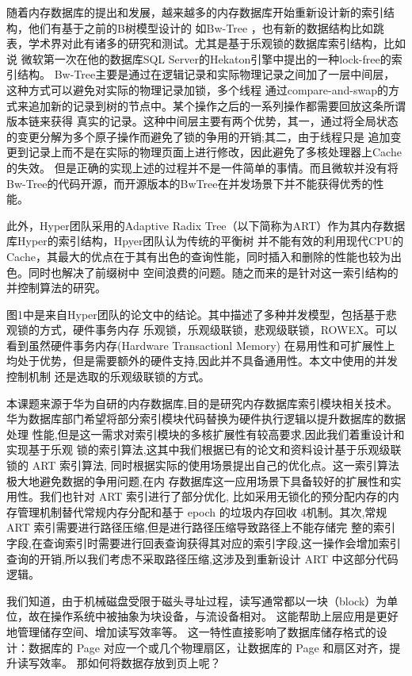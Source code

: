 随着内存数据库的提出和发展，越来越多的内存数据库开始重新设计新的索引结构，他们有基于之前的B树模型设计的
如Bw-Tree\cite{alvarez2015comparison}
\cite{leis2016art}，也有新的数据结构比如跳表，学术界对此有诸多的研究和测试。尤其是基于乐观锁的数据库索引结构，比如说
微软第一次在他的数据库SQL Server的Hekaton引擎中提出的一种lock-free的索引结构。
Bw-Tree主要是通过在逻辑记录和实际物理记录之间加了一层中间层，这种方式可以避免对实际的物理记录加锁，多个线程
通过compare-and-swap的方式来追加新的记录到树的节点中。某个操作之后的一系列操作都需要回放这条所谓版本链来获得
真实的记录。这种中间层主要有两个优势，其一，通过将全局状态的变更分解为多个原子操作而避免了锁的争用的开销;其二，由于线程只是
追加变更到记录上而不是在实际的物理页面上进行修改，因此避免了多核处理器上Cache的失效。
但是正确的实现上述的过程并不是一件简单的事情。而且微软并没有将Bw-Tree的代码开源，而开源版本的BwTree在并发场景下并不能获得优秀的性能。

此外，Hyper团队采用的Adaptive Radix Tree（以下简称为ART）作为其内存数据库Hyper的索引结构，Hpyer团队认为传统的平衡树
并不能有效的利用现代CPU的Cache，其最大的优点在于其有出色的查询性能，同时插入和删除的性能也较为出色。同时也解决了前缀树中
空间浪费的问题。随之而来的是针对这一索引结构的并控制算法的研究。

图1中是来自Hyper团队的论文中的结论。其中描述了多种并发模型，包括基于悲观锁的方式，硬件事务内存
乐观锁，乐观级联锁，悲观级联锁，ROWEX。可以看到虽然硬件事务内存(Hardware Transactionl Memory)
在易用性和可扩展性上均处于优势，但是需要额外的硬件支持,因此并不具备通用性。本文中使用的并发控制机制
还是选取的乐观级联锁的方式。
  
本课题来源于华为自研的内存数据库,目的是研究内存数据库索引模块相关技术。
华为数据库部门希望将部分索引模块代码替换为硬件执行逻辑以提升数据库的数据处理
性能,但是这一需求对索引模块的多核扩展性有较高要求,因此我们着重设计和实现基于乐观
锁的索引算法,这其中我们根据已有的论文和资料设计基于乐观级联锁的 ART 索引算法,
同时根据实际的使用场景提出自己的优化点。这一索引算法极大地避免数据的争用问题,在内
存数据库这一应用场景下具备较好的扩展性和实用性。我们也针对 ART 索引进行了部分优化,
比如采用无锁化的预分配内存的内存管理机制替代常规内存分配和基于 epoch 的垃圾内存回收
4机制。其次,常规 ART 索引需要进行路径压缩,但是进行路径压缩导致路径上不能存储完
整的索引字段,在查询索引时需要进行回表查询获得其对应的索引字段,这一操作会增加索引
查询的开销,所以我们考虑不采取路径压缩,这涉及到重新设计 ART 中这部分代码逻辑。

我们知道，由于机械磁盘受限于磁头寻址过程，读写通常都以一块（block）为单位，故在操作系统中被抽象为块设备，与流设备相对。
这能帮助上层应用是更好地管理储存空间、增加读写效率等。
这一特性直接影响了数据库储存格式的设计：数据库的 Page 对应一个或几个物理扇区，让数据库的 Page 和扇区对齐，提升读写效率。
那如何将数据存放到页上呢？

